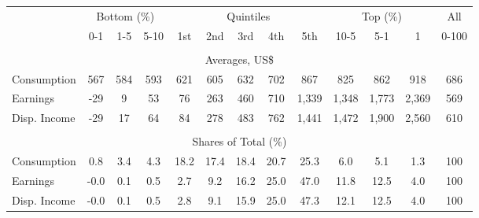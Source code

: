 \begin{tabular}{l c c c| c c c c c| c c c| c}
\toprule
&\multicolumn{3}{c|}{Bottom (\%)} & \multicolumn{5}{c|}{Quintiles} & \multicolumn{3}{c|}{Top (\%)} & All  \\
& 0-1 & 1-5 & 5-10 &  1st & 2nd & 3rd & 4th & 5th & 10-5 & 5-1 & 1 & 0-100 \\
\midrule \\
\multicolumn{13}{c}{Averages, US\$} \\
\midrule
Consumption  & 567  & 584  & 593  & 621  & 605  & 632  & 702  & 867  & 825  & 862  & 918  & 686 \\
Earnings         & -29 & 9 & 53 & 76 & 263 & 460 & 710 & 1,339 & 1,348 & 1,773 & 2,369 & 569 \\
Disp. Income & -29 & 17 & 64 & 84 & 278 & 483 & 762 & 1,441 & 1,472 & 1,900 & 2,560 & 610 \\
\midrule \\
\multicolumn{13}{c}{Shares of Total (\%)} \\
\midrule
Consumption  & 0.8   & 3.4   & 4.3   & 18.2   & 17.4   & 18.4   & 20.7   & 25.3   & 6.0   & 5.1   & 1.3   & 100 \\
Earnings         & -0.0  & 0.1  & 0.5  & 2.7  & 9.2  & 16.2  & 25.0  & 47.0  & 11.8  & 12.5  & 4.0  & 100 \\
Disp. Income & -0.0  & 0.1  & 0.5  & 2.8  & 9.1  & 15.9  & 25.0  & 47.3  & 12.1  & 12.5  & 4.0  & 100 \\
\bottomrule
\end{tabular}